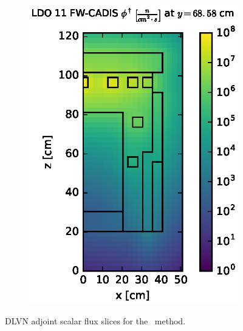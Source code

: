\begin{figure}[!htb]
\begin{subfigure}{0.4\textwidth}
\includegraphics[max height=0.445\textheight]
{img/dlvn-plots/fwc-adj/flux-ldo11-slice.eps}
\end{subfigure}
\caption{DLVN adjoint scalar flux slices for the \fwc\ method.}
\label{dlvn-fwc-adj-slices}
\end{figure}

